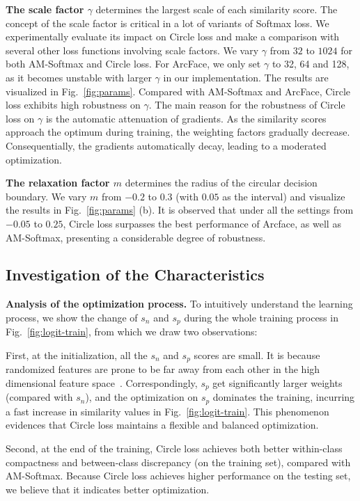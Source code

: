 \documentclass[10pt,twocolumn,letterpaper]{article}
\begin{document}
\textbf{The scale factor $\gamma$} determines the largest scale of each similarity score. The concept of the scale factor is critical in a lot of variants of Softmax loss. We experimentally evaluate its impact on Circle loss and make a comparison with several other loss functions involving scale factors. We vary $\gamma$ from $32$ to $1024$ for both AM-Softmax and Circle loss. For ArcFace, we only set $\gamma$ to 32, 64 and 128, as it becomes unstable with larger $\gamma$ in our implementation. The results are visualized in Fig.~\ref{fig:params}. Compared with AM-Softmax and ArcFace, Circle loss exhibits high robustness on $\gamma$. The main reason for the robustness of Circle loss on $\gamma$ is the automatic attenuation of gradients. As the similarity scores approach the optimum during training, the weighting factors gradually decrease. Consequentially, the gradients automatically decay, leading to a moderated optimization.

\textbf{The relaxation factor $m$} determines the radius of the circular decision boundary. We vary $m$ from $-0.2$ to $0.3$ (with $0.05$ as the interval) and visualize the results in Fig.~\ref{fig:params} (b). It is observed that under all the settings from $-0.05$ to $0.25$, Circle loss surpasses the best performance of Arcface, as well as AM-Softmax, presenting a considerable degree of robustness. 


\subsection{Investigation of the Characteristics}\label{sec:exp_mechanism}

\textbf{Analysis of the optimization process.}\quad
To intuitively understand the learning process, we show the change of $s_n$ and $s_p$ during the whole training process in Fig.~\ref{fig:logit-train}, from which we draw two observations:

First, at the initialization, all the $s_n$ and $s_p$ scores are small. It is because randomized features are prone to be far away from each other in the high dimensional feature space~\cite{Zhang2019AdaCosAS,helanqing_dissection}. Correspondingly, $s_p$ get significantly larger weights (compared with $s_n$), and the optimization on $s_p$ dominates the training, incurring a fast increase in similarity values in Fig.~\ref{fig:logit-train}. This phenomenon evidences that Circle loss maintains a flexible and balanced optimization.
 
Second, at the end of the training, Circle loss achieves both better within-class compactness and between-class discrepancy (on the training set), compared with AM-Softmax. Because Circle loss achieves higher performance on the testing set, we believe that it indicates better optimization.
\end{document}
